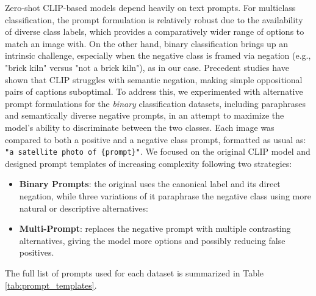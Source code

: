 \documentclass[a4paper, twoside, english]{sapthesis} %
\begin{document}
Zero-shot CLIP-based models depend heavily on text prompts. For multiclass classification, the prompt formulation is relatively robust due to the availability of diverse class labels, which provides a comparatively wider range of options to match an image with. On the other hand, binary classification brings up an intrinsic challenge, especially when the negative class is framed via negation (e.g., "brick kiln" versus "not a brick kiln"), as in our case.
Precedent studies \cite{quantmeyer2024and} have shown that CLIP struggles with semantic negation, making simple oppositional pairs of captions suboptimal. To address this, we experimented with alternative prompt formulations for the \emph{binary} classification datasets, including paraphrases and semantically diverse negative prompts, in an attempt to maximize the model's ability to discriminate between the two classes.
Each image was compared to both a positive and a negative class prompt, formatted as usual as: \texttt{"a satellite photo of \{prompt\}"}.
We focused on the original CLIP model and designed prompt templates of increasing complexity following two strategies:
\begin{itemize}
    \item \textbf{Binary Prompts}: the original uses the canonical label and its direct negation, while three variations of it paraphrase the negative class using more natural or descriptive alternatives:
    \item \textbf{Multi-Prompt}: replaces the negative prompt with multiple contrasting alternatives, giving the model more options and possibly reducing false positives.
\end{itemize}

The full list of prompts used for each dataset is summarized in Table \ref{tab:prompt_templates}.
\end{document}
